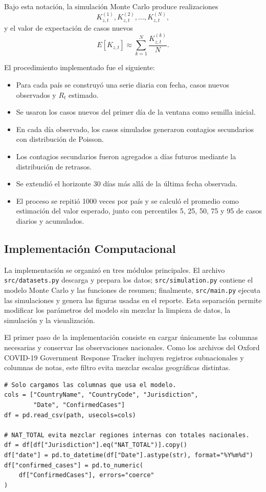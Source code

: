 \documentclass[12pt]{article}
\begin{document}
Bajo esta notación, la simulación Monte Carlo produce realizaciones
\[
  K_{z,t}^{(1)}, K_{z,t}^{(2)}, \dots, K_{z,t}^{(N)},
\]
y el valor de expectación de casos nuevos
\[
  E[K_{z,t}] \approx
  \sum_{k=1}^{N} \frac{K_{z,t}^{(k)}}{N}.
\]

El procedimiento implementado fue el siguiente:

\begin{itemize}
  \item Para cada país se construyó una serie diaria con fecha, casos nuevos
        observados y \(R_t\) estimado.
  \item Se usaron los casos nuevos del primer día de la ventana como semilla
        inicial.
  \item En cada día observado, los casos simulados generaron contagios
        secundarios con distribución de Poisson.
  \item Los contagios secundarios fueron agregados a días futuros mediante la
        distribución de retrasos.
  \item Se extendió el horizonte 30 días más allá de la última fecha observada.
  \item El proceso se repitió 1000 veces por país y se calculó el promedio
        como estimación del valor esperado, junto con percentiles 5, 25, 50,
        75 y 95 de casos diarios y acumulados.
\end{itemize}

\subsection{Implementación Computacional}

La implementación se organizó en tres módulos principales. El archivo
\texttt{src/datasets.py} descarga y prepara los datos; \texttt{src/simulation.py}
contiene el modelo Monte Carlo y las funciones de resumen; finalmente,
\texttt{src/main.py} ejecuta las simulaciones y genera las figuras usadas en el
reporte. Esta separación permite modificar los parámetros del modelo sin
mezclar la limpieza de datos, la simulación y la visualización.

El primer paso de la implementación consiste en cargar únicamente las columnas
necesarias y conservar las observaciones nacionales. Como los archivos del
Oxford COVID-19 Government Response Tracker incluyen registros subnacionales y
columnas de notas, este filtro evita mezclar escalas geográficas distintas.

\begin{lstlisting}[caption={Carga de columnas y filtro nacional.},label={lst:data-filter}]
# Solo cargamos las columnas que usa el modelo.
cols = ["CountryName", "CountryCode", "Jurisdiction",
        "Date", "ConfirmedCases"]
df = pd.read_csv(path, usecols=cols)

# NAT_TOTAL evita mezclar regiones internas con totales nacionales.
df = df[df["Jurisdiction"].eq("NAT_TOTAL")].copy()
df["date"] = pd.to_datetime(df["Date"].astype(str), format="%Y%m%d")
df["confirmed_cases"] = pd.to_numeric(
    df["ConfirmedCases"], errors="coerce"
)
\end{lstlisting}
\end{document}
